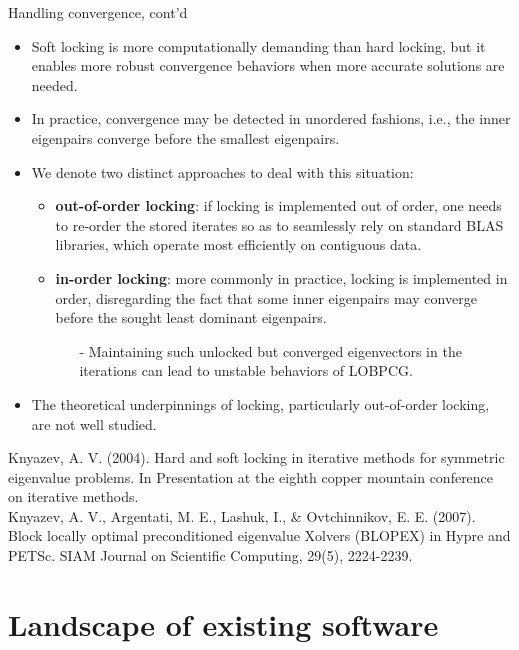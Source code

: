 \documentclass[t,usepdftitle=false]{beamer}
\begin{document}
\begin{frame}{Handling convergence, cont'd}
\begin{itemize}
\item Soft locking is more computationally demanding than hard locking, but it enables more robust convergence behaviors when more accurate solutions are needed.
\item In practice, convergence may be detected in unordered fashions, i.e., the inner eigenpairs converge before the smallest eigenpairs.
\item We denote two distinct approaches to deal with this situation:
\begin{itemize}
	\item \textbf{out-of-order locking}: if locking is implemented out of order, one needs to re-order the stored iterates so as to seamlessly rely on standard BLAS libraries, which operate most efficiently on contiguous data.
	\item \textbf{in-order locking}: more commonly in practice, locking is implemented in order, disregarding the fact that some inner eigenpairs may converge before the sought least dominant eigenpairs.\\
	\begin{itemize}
	\item[-]Maintaining such unlocked but converged eigenvectors in the iterations can lead to unstable behaviors of LOBPCG.
	\end{itemize}
\end{itemize}
\item The theoretical underpinnings of locking, particularly out-of-order locking, are not well studied.
\end{itemize}		
\smallskip
\tiny{Knyazev, A. V. (2004). Hard and soft locking in iterative methods for symmetric eigenvalue problems. In Presentation at the eighth copper mountain conference on iterative methods.}\tinyskip\\
\tiny{Knyazev, A. V., Argentati, M. E., Lashuk, I., \& Ovtchinnikov, E. E. (2007). Block locally optimal preconditioned eigenvalue Xolvers (BLOPEX) in Hypre and PETSc. SIAM Journal on Scientific Computing, 29(5), 2224-2239.}
\end{frame}

\section{Landscape of existing software}
\end{document}
